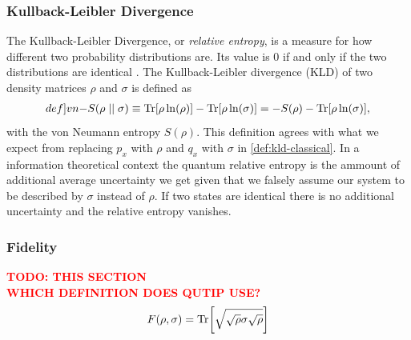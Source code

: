 \documentclass{book}
\numberwithin{equation}{section} %
\begin{document}
\subsubsection{Kullback-Leibler Divergence}
The Kullback-Leibler Divergence, or \emph{relative entropy}, is a measure for how different two
probability distributions are. Its value is 0 if and only if the two distributions are identical \cite{HS_BA_SeifertSkript}.
The Kullback-Leibler divergence (KLD) of two density matrices $\rho$ and $\sigma$ is defined as
\begin{align}\label[def]{vn-}
    S(\rho\mid\mid\sigma) \equiv \Trace[\rho\ln(\rho)] - \Trace[\rho\ln(\sigma)] = - S(\rho) - \Trace[\rho\ln(\sigma)],
\end{align}
with the von Neumann entropy $S(\rho)$.
This definition agrees with what we expect from replacing $p_x$ with $\rho$ and $q_x$ with $\sigma$ in
\cref{def:kld-classical}.
In a information theoretical context the quantum relative entropy is the ammount of additional average uncertainty we get
given that we falsely assume our system to be described by $\sigma$ instead of $\rho$.
If two states are identical there is no additional uncertainty and the relative entropy vanishes.
\subsubsection{Fidelity}
\textcolor{red}{\textbf{TODO: THIS SECTION\\WHICH DEFINITION DOES QUTIP USE?}}
\begin{align}
    F(\rho,\sigma) = \Tr[\sqrt{\sqrt{\rho}\sigma\sqrt{\rho}}]
\end{align}
\end{document}
